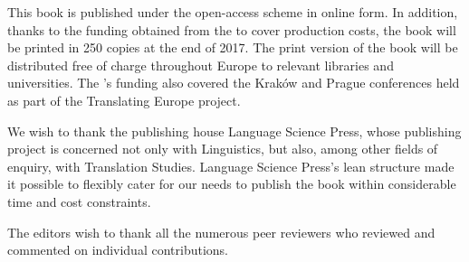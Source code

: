 This book is published under the open-access scheme in online form. In addition, thanks to the funding obtained from the  to cover production costs, the book will be printed in 250 copies at the end of 2017. The print version of the book will be distributed free of charge throughout Europe to relevant libraries and universities. The ’s funding also covered the Kraków and Prague conferences held as part of the Translating Europe project.

We wish to thank the publishing house Language Science Press, whose publishing project is concerned not only with Linguistics, but also, among other fields of enquiry, with Translation Studies. Language Science Press's lean structure made it possible to flexibly cater for our needs to publish the book within considerable time and cost constraints.

The editors wish to thank all the numerous peer reviewers who reviewed and commented on individual contributions. 
